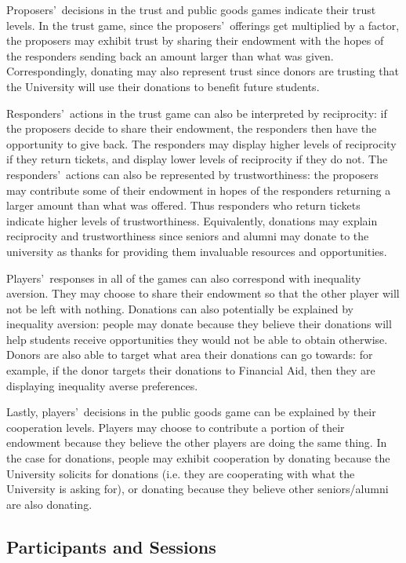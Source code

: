 \documentclass[12pt]{article}
\begin{document}
Proposers\rq \ decisions in the trust and public goods games indicate their trust levels. In the trust game, since the proposers\rq \ offerings get multiplied by a factor, the proposers may exhibit trust by sharing their endowment with the hopes of the responders sending back an amount larger than what was given. Correspondingly, donating may also represent trust since donors are trusting that the University will use their donations to benefit future students.

Responders\rq \ actions in the trust game can also be interpreted by reciprocity: if the proposers decide to share their endowment, the responders then have the opportunity to give back. The responders may display higher levels of reciprocity if they return tickets, and display lower levels of reciprocity if they do not. The responders\rq \ actions can also be represented by trustworthiness: the proposers may contribute some of their endowment in hopes of the responders returning a larger amount than what was offered. Thus responders who return tickets indicate higher levels of trustworthiness. Equivalently, donations may explain reciprocity and trustworthiness since seniors and alumni may donate to the university as thanks for providing them invaluable resources and opportunities.

Players\rq \ responses in all of the games can also correspond with inequality aversion. They may choose to share their endowment so that the other player will not be left with nothing. Donations can also potentially be explained by inequality aversion: people may donate because they believe their donations will help students receive opportunities they would not be able to obtain otherwise. Donors are also able to target what area their donations can go towards: for example, if the donor targets their donations to Financial Aid, then they are displaying inequality averse preferences.

Lastly, players\rq \ decisions in the public goods game can be explained by their cooperation levels. Players may choose to contribute a portion of their endowment because they believe the other players are doing the same thing. In the case for donations, people may exhibit cooperation by donating because the University solicits for donations (i.e. they are cooperating with what the University is asking for), or donating because they believe other seniors/alumni are also donating.

	
\subsection{Participants and Sessions}
\end{document}
